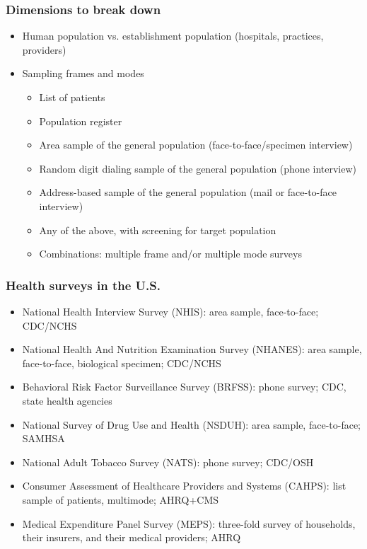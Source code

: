 \documentclass{beamer}
\begin{document}
\begin{frame}\frametitle{Dimensions to break down}

\begin{itemize}
    \item Human population vs. establishment population (hospitals, practices, providers)
    \item Sampling frames and modes
    \begin{itemize}
        \item List of patients
        \item Population register
        \item Area sample of the general population (face-to-face/specimen interview)
        \item Random digit dialing sample of the general population (phone interview)
        \item Address-based sample of the general population (mail or face-to-face interview)
        \item Any of the above, with screening for target population
        \item Combinations: multiple frame and/or multiple mode surveys
    \end{itemize}
\end{itemize}

\end{frame}

\begin{frame}\frametitle{Health surveys in the U.S.}

\begin{itemize}
    \item National Health Interview Survey (NHIS): area sample, face-to-face; CDC/NCHS
    \item National Health And Nutrition Examination Survey (NHANES): area sample, face-to-face, biological specimen; CDC/NCHS
    \item Behavioral Risk Factor Surveillance Survey (BRFSS): phone survey; CDC, state health agencies
    \item National Survey of Drug Use and Health (NSDUH): area sample, face-to-face; SAMHSA
    \item National Adult Tobacco Survey (NATS): phone survey; CDC/OSH
    \item Consumer Assessment of Healthcare Providers and Systems (CAHPS): list sample of patients, multimode; AHRQ+CMS
    \item Medical Expenditure Panel Survey (MEPS): three-fold survey of households, their insurers, and their medical providers; AHRQ
\end{itemize}

\end{frame}
\end{document}
